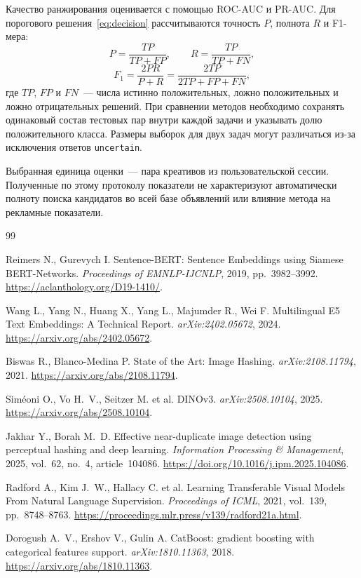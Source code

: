 \documentclass{misisarticle}
\begin{document}
Качество ранжирования оценивается с помощью ROC-AUC и PR-AUC. Для порогового решения~\eqref{eq:decision} рассчитываются точность $P$, полнота $R$ и F1-мера:
\begin{equation}
  P=\frac{TP}{TP+FP},\qquad
  R=\frac{TP}{TP+FN},
\end{equation}
\begin{equation}
  F_1=\frac{2PR}{P+R}
      =\frac{2TP}{2TP+FP+FN},
\end{equation}
где $TP$, $FP$ и $FN$~--- числа истинно положительных, ложно положительных и ложно отрицательных решений. При сравнении методов необходимо сохранять одинаковый состав тестовых пар внутри каждой задачи и указывать долю положительного класса. Размеры выборок для двух задач могут различаться из-за исключения ответов \texttt{uncertain}.

Выбранная единица оценки~--- пара креативов из пользовательской сессии. Полученные по этому протоколу показатели не характеризуют автоматически полноту поиска кандидатов во всей базе объявлений или влияние метода на рекламные показатели.

\begin{thebibliography}{99}

Reimers N., Gurevych I. Sentence-BERT: Sentence Embeddings using Siamese BERT-Networks. \textit{Proceedings of EMNLP-IJCNLP}, 2019, pp.~3982--3992. \url{https://aclanthology.org/D19-1410/}.

Wang L., Yang N., Huang X., Yang L., Majumder R., Wei F. Multilingual E5 Text Embeddings: A Technical Report. \textit{arXiv:2402.05672}, 2024. \url{https://arxiv.org/abs/2402.05672}.

Biswas R., Blanco-Medina P. State of the Art: Image Hashing. \textit{arXiv:2108.11794}, 2021. \url{https://arxiv.org/abs/2108.11794}.

Sim\'eoni O., Vo H.~V., Seitzer M. et al. DINOv3. \textit{arXiv:2508.10104}, 2025. \url{https://arxiv.org/abs/2508.10104}.

Jakhar Y., Borah M.~D. Effective near-duplicate image detection using perceptual hashing and deep learning. \textit{Information Processing \& Management}, 2025, vol.~62, no.~4, article~104086. \url{https://doi.org/10.1016/j.ipm.2025.104086}.

Radford A., Kim J.~W., Hallacy C. et al. Learning Transferable Visual Models From Natural Language Supervision. \textit{Proceedings of ICML}, 2021, vol.~139, pp.~8748--8763. \url{https://proceedings.mlr.press/v139/radford21a.html}.

Dorogush A.~V., Ershov V., Gulin A. CatBoost: gradient boosting with categorical features support. \textit{arXiv:1810.11363}, 2018. \url{https://arxiv.org/abs/1810.11363}.

\end{thebibliography}
\end{document}
